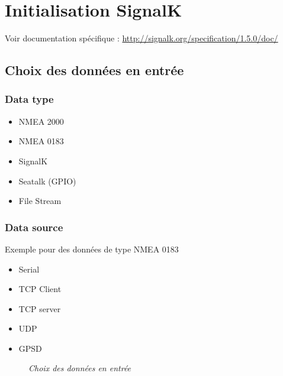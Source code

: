 \section{Initialisation SignalK}
Voir documentation spécifique  : \href{http://signalk.org/specification/1.5.0/doc/}{http://signalk.org/specification/1.5.0/doc/}
\subsection{Choix des données en entrée}
\subsubsection{Data type}
\begin{itemize}
\item NMEA 2000
\item NMEA 0183
\item SignalK
\item Seatalk (GPIO)
\item File Stream
\end{itemize}
\subsubsection{Data source}
Exemple pour des données de type NMEA 0183
\begin{itemize}
\item Serial
\item TCP Client
\item TCP server
\item UDP
\item GPSD
\end{itemize}
\begin{center}
\begin{figure}[ht]
\caption{\label{data}\textit{Choix des données en entrée}}
\end{figure}
\end{center}
